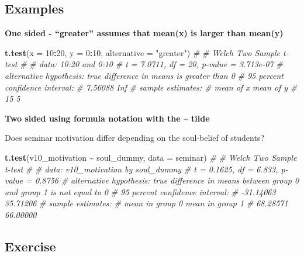 \documentclass[
]{book}
\newenvironment{Shaded}{\begin{snugshade}}{\end{snugshade}}
\newcommand{\AttributeTok}[1]{\textcolor[rgb]{0.13,0.29,0.53}{#1}}
\newcommand{\CommentTok}[1]{\textcolor[rgb]{0.56,0.35,0.01}{\textit{#1}}}
\newcommand{\DecValTok}[1]{\textcolor[rgb]{0.00,0.00,0.81}{#1}}
\newcommand{\FunctionTok}[1]{\textcolor[rgb]{0.13,0.29,0.53}{\textbf{#1}}}
\newcommand{\NormalTok}[1]{#1}
\newcommand{\SpecialCharTok}[1]{\textcolor[rgb]{0.81,0.36,0.00}{\textbf{#1}}}
\newcommand{\StringTok}[1]{\textcolor[rgb]{0.31,0.60,0.02}{#1}}
\begin{document}
\subsection{Examples}\label{examples}

\textbf{One sided - ``greater'' assumes that mean(x) is larger than mean(y)}

\begin{Shaded}
\begin{Highlighting}[]
\FunctionTok{t.test}\NormalTok{(}\AttributeTok{x =} \DecValTok{10}\SpecialCharTok{:}\DecValTok{20}\NormalTok{, }\AttributeTok{y =} \DecValTok{0}\SpecialCharTok{:}\DecValTok{10}\NormalTok{, }\AttributeTok{alternative =} \StringTok{"greater"}\NormalTok{)}
\CommentTok{\# }
\CommentTok{\#   Welch Two Sample t{-}test}
\CommentTok{\# }
\CommentTok{\# data:  10:20 and 0:10}
\CommentTok{\# t = 7.0711, df = 20, p{-}value = 3.713e{-}07}
\CommentTok{\# alternative hypothesis: true difference in means is greater than 0}
\CommentTok{\# 95 percent confidence interval:}
\CommentTok{\#  7.56088     Inf}
\CommentTok{\# sample estimates:}
\CommentTok{\# mean of x mean of y }
\CommentTok{\#        15         5}
\end{Highlighting}
\end{Shaded}

\textbf{Two sided using formula notation with the \textasciitilde{} tilde}

Does seminar motivation differ depending on the soul-belief of students?

\begin{Shaded}
\begin{Highlighting}[]
\FunctionTok{t.test}\NormalTok{(v10\_motivation }\SpecialCharTok{\textasciitilde{}}\NormalTok{ soul\_dummy, }\AttributeTok{data =}\NormalTok{ seminar)}
\CommentTok{\# }
\CommentTok{\#   Welch Two Sample t{-}test}
\CommentTok{\# }
\CommentTok{\# data:  v10\_motivation by soul\_dummy}
\CommentTok{\# t = 0.1625, df = 6.833, p{-}value = 0.8756}
\CommentTok{\# alternative hypothesis: true difference in means between group 0 and group 1 is not equal to 0}
\CommentTok{\# 95 percent confidence interval:}
\CommentTok{\#  {-}31.14063  35.71206}
\CommentTok{\# sample estimates:}
\CommentTok{\# mean in group 0 mean in group 1 }
\CommentTok{\#        68.28571        66.00000}
\end{Highlighting}
\end{Shaded}

\subsection{\texorpdfstring{Exercise }{Exercise }}\label{exercise-4}
\end{document}
